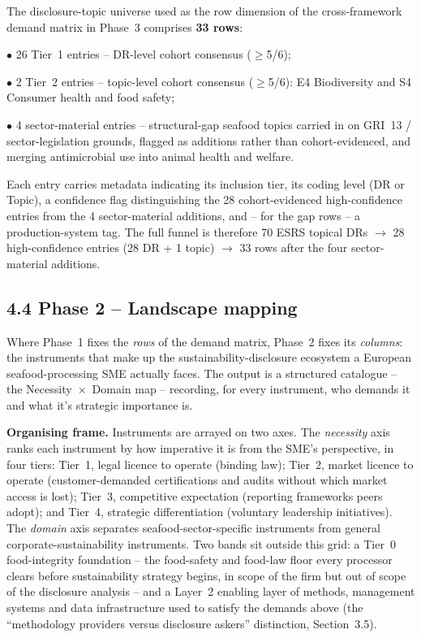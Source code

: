 \documentclass[
]{article}
\begin{document}
The disclosure-topic universe used as the row dimension of the
cross-framework demand matrix in Phase~3 comprises \textbf{33 rows}:

$\bullet$ 26 Tier~1 entries -- DR-level cohort consensus ($\geq$5/6);

$\bullet$ 2 Tier~2 entries -- topic-level cohort consensus ($\geq$5/6): E4
Biodiversity and S4 Consumer health and food safety;

$\bullet$ 4 sector-material entries -- structural-gap seafood topics carried
in on GRI~13 / sector-legislation grounds, flagged as additions rather
than cohort-evidenced, and merging antimicrobial use into animal health
and welfare.

Each entry carries metadata indicating its inclusion tier, its coding
level (DR or Topic), a confidence flag distinguishing the 28
cohort-evidenced high-confidence entries from the 4 sector-material
additions, and -- for the gap rows -- a production-system tag. The full
funnel is therefore 70 ESRS topical DRs $\to$ 28 high-confidence entries
(28 DR + 1 topic) $\to$ 33 rows after the four sector-material additions.

\subsection{4.4 Phase 2 -- Landscape
mapping}\label{phase-2---landscape-mapping}

Where Phase~1 fixes the \emph{rows} of the demand matrix, Phase~2 fixes
its \emph{columns}: the instruments that make up the
sustainability-disclosure ecosystem a European seafood-processing SME
actually faces. The output is a structured catalogue -- the
Necessity~$\times$~Domain map -- recording, for every instrument, who demands it and what it's strategic importance is.

\textbf{Organising frame.} Instruments are arrayed on two axes. The
\emph{necessity} axis ranks each instrument by how imperative it is from
the SME's perspective, in four tiers: Tier~1, legal licence to operate
(binding law); Tier~2, market licence to operate (customer-demanded
certifications and audits without which market access is lost); Tier~3,
competitive expectation (reporting frameworks peers adopt); and Tier~4,
strategic differentiation (voluntary leadership initiatives). The
\emph{domain} axis separates seafood-sector-specific instruments from
general corporate-sustainability instruments. Two bands sit outside this
grid: a Tier~0 food-integrity foundation -- the food-safety and food-law
floor every processor clears before sustainability strategy begins, in
scope of the firm but out of scope of the disclosure analysis -- and a
Layer~2 enabling layer of methods, management systems and data
infrastructure used to satisfy the demands above (the
``methodology providers versus disclosure askers'' distinction,
Section~3.5).
\end{document}
